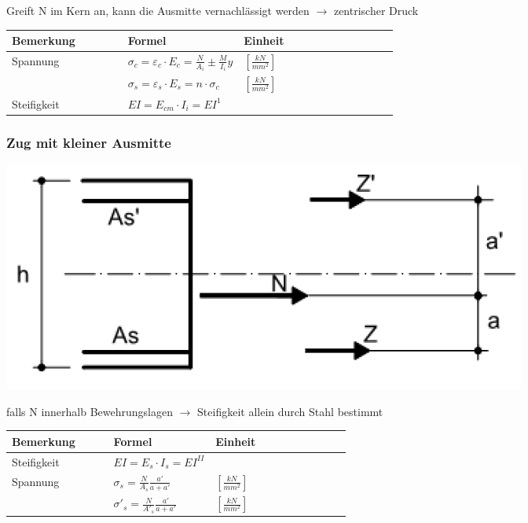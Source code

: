 \begin{multicols}{2}
	
	Greift N im Kern an, kann die Ausmitte vernachlässigt werden $ \rightarrow $ zentrischer Druck
	
	\begin{tabular}{p{0.3\linewidth}|p{0.3\linewidth}|l}
		
		Bemerkung		& Formel		& Einheit \\ \hline
		
		
		Spannung		& $ \sigma_c = \varepsilon_c \cdot E_c = \frac{N}{A_i} \pm \frac{M}{I_i}y $	& $ \left[ \frac{kN}{mm^2} \right]$ \\
		& $ \sigma_s = \varepsilon_s \cdot E_s = n \cdot \sigma_c $	& $ \left[ \frac{kN}{mm^2} \right]$ \\
		
		Steifigkeit	& $ EI = E_{cm} \cdot I_i = EI^1 $	& \\
		
	\end{tabular}
	
	
	\subsubsection{Zug mit kleiner Ausmitte}

	
		
	\includegraphics[width=0.5\linewidth]{images/Risse8ZugklEx.PNG}
	
	
	falls N innerhalb Bewehrungslagen $ \rightarrow $ Steifigkeit allein durch Stahl bestimmt
	
	\begin{tabular}{p{0.3\linewidth}|p{0.3\linewidth}|l}
		
		Bemerkung		& Formel		& Einheit \\ \hline
		
		
		Steifigkeit		& $ EI = E_{s} \cdot I_s = EI^{II} $	&	\\
		
		Spannung		& $ \sigma_s = \frac{N}{A_s} \frac{a'}{a + a'} $		& $ \left[ \frac{kN}{mm^2}\right] $ \\	
		
		& $ \sigma'_s = \frac{N}{A'_s} \frac{a'}{a + a'} $	& $ \left[ \frac{kN}{mm^2}\right] $ 
	
	\end{tabular}
	

\end{multicols}
